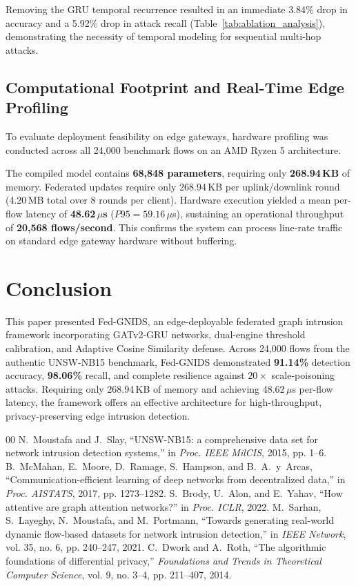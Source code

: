 \documentclass[conference]{IEEEtran}
\begin{document}
Removing the GRU temporal recurrence resulted in an immediate 3.84\% drop in accuracy and a 5.92\% drop in attack recall (Table~\ref{tab:ablation_analysis}), demonstrating the necessity of temporal modeling for sequential multi-hop attacks.

\subsection{Computational Footprint and Real-Time Edge Profiling}
To evaluate deployment feasibility on edge gateways, hardware profiling was conducted across all 24,000 benchmark flows on an AMD Ryzen 5 architecture.

The compiled model contains \textbf{68,848 parameters}, requiring only \textbf{268.94\,KB} of memory. Federated updates require only 268.94\,KB per uplink/downlink round (4.20\,MB total over 8 rounds per client). Hardware execution yielded a mean per-flow latency of \textbf{48.62\,$\mu$s} ($P95 = 59.16\,\mu$s), sustaining an operational throughput of \textbf{20,568 flows/second}. This confirms the system can process line-rate traffic on standard edge gateway hardware without buffering.

\section{Conclusion}
This paper presented Fed-GNIDS, an edge-deployable federated graph intrusion framework incorporating GATv2-GRU networks, dual-engine threshold calibration, and Adaptive Cosine Similarity defense. Across 24,000 flows from the authentic UNSW-NB15 benchmark, Fed-GNIDS demonstrated \textbf{91.14\%} detection accuracy, \textbf{98.06\%} recall, and complete resilience against $20\times$ scale-poisoning attacks. Requiring only 268.94\,KB of memory and achieving 48.62\,$\mu$s per-flow latency, the framework offers an effective architecture for high-throughput, privacy-preserving edge intrusion detection.

\begin{thebibliography}{00}
 N.~Moustafa and J.~Slay, ``UNSW-NB15: a comprehensive data set for network intrusion detection systems,'' in \textit{Proc. IEEE MilCIS}, 2015, pp. 1--6.
 B.~McMahan, E.~Moore, D.~Ramage, S.~Hampson, and B.~A.~y~Arcas, ``Communication-efficient learning of deep networks from decentralized data,'' in \textit{Proc. AISTATS}, 2017, pp. 1273--1282.
 S.~Brody, U.~Alon, and E.~Yahav, ``How attentive are graph attention networks?'' in \textit{Proc. ICLR}, 2022.
 M.~Sarhan, S.~Layeghy, N.~Moustafa, and M.~Portmann, ``Towards generating real-world dynamic flow-based datasets for network intrusion detection,'' in \textit{IEEE Network}, vol. 35, no. 6, pp. 240--247, 2021.
 C.~Dwork and A.~Roth, ``The algorithmic foundations of differential privacy,'' \textit{Foundations and Trends in Theoretical Computer Science}, vol. 9, no. 3--4, pp. 211--407, 2014.
\end{thebibliography}
\end{document}
